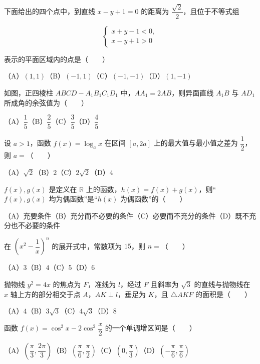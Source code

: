\begin{question}
下面给出的四个点中，到直线 $x-y+1=0$ 的距离为 $\dfrac{\sqrt2}{2}$，且位于不等式组

\nopagebreak[4]
\[
\begin{cases}
x+y-1<0,\\
x-y+1>0
\end{cases}
\]

表示的平面区域内的点是\mbox{（　　）}

（A）$(1,1)$\quad（B）$(-1,1)$\quad（C）$(-1,-1)$\quad（D）$(1,-1)$

\Needspace{0.4\textheight}
\end{question}
\begin{question}
如图，正四棱柱 $ABCD-A_1B_1C_1D_1$ 中，$AA_1=2AB$，则异面直线 $A_1B$ 与 $AD_1$ 所成角的余弦值为\mbox{（　　）}
\nopagebreak[4]
\begin{center}\end{center}
\nopagebreak[4]
（A）$\dfrac15$\quad（B）$\dfrac25$\quad（C）$\dfrac35$\quad（D）$\dfrac45$

\end{question}
\begin{question}
设 $a>1$，函数 $f(x)=\log_a x$ 在区间 $[a,2a]$ 上的最大值与最小值之差为 $\dfrac12$，则 $a=$\mbox{（　　）}

（A）$\sqrt2$\quad（B）$2$\quad（C）$2\sqrt2$\quad（D）$4$

\end{question}
\begin{question}
$f(x),g(x)$ 是定义在 $\mathbb R$ 上的函数，$h(x)=f(x)+g(x)$，则“$f(x),g(x)$ 均为偶函数”是“$h(x)$ 为偶函数”的\mbox{（　　）}

（A）充要条件\quad（B）充分而不必要的条件\quad（C）必要而不充分的条件\quad（D）既不充分也不必要的条件

\end{question}
\begin{question}
在 $\left(x^2-\dfrac1x\right)^n$ 的展开式中，常数项为 $15$，则 $n=$\mbox{（　　）}

（A）$3$\quad（B）$4$\quad（C）$5$\quad（D）$6$

\end{question}
\begin{question}
抛物线 $y^2=4x$ 的焦点为 $F$，准线为 $l$，经过 $F$ 且斜率为 $\sqrt3$ 的直线与抛物线在 $x$ 轴上方的部分相交于点 $A$，$AK\perp l$，垂足为 $K$，且 $\triangle AKF$ 的面积是\mbox{（　　）}

（A）$4$\quad（B）$3\sqrt3$\quad（C）$4\sqrt3$\quad（D）$8$

\end{question}
\begin{question}
函数 $f(x)=\cos^2x-2\cos^2\dfrac x2$ 的一个单调增区间是\mbox{（　　）}

（A）$\left(\dfrac\pi3,\dfrac{2\pi}3\right)$\quad（B）$\left(\dfrac\pi6,\dfrac\pi2\right)$\quad（C）$\left(0,\dfrac\pi3\right)$\quad（D）$\left(-\dfrac\pi6,\dfrac\pi6\right)$

\end{question}

